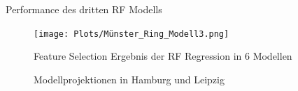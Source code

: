 \documentclass[a4paper,12pt]{thesis}
\begin{document}
\begin{table}
	\caption{Performance des dritten RF Modells}
	\label{tbl:RF3}
\end{table}

\begin{figure}[!ht]
	\centering
	\texttt{[image: Plots/Münster\_Ring\_Modell3.png]}
	\caption{Feature Selection Ergebnis der RF Regression in 6 Modellen}
	\label{Munster}
\end{figure}

\begin{figure}%
	\centering
	
	\caption{Modellprojektionen in Hamburg und Leipzig}%
	\label{fig:HamburgundLeipzig}%
\end{figure}
\end{document}
